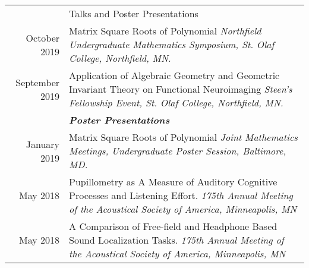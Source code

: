 \documentclass[letterpaper, 11pt]{article}
\newcommand{\headingfont}{\Large\color{Red}}
\newenvironment{SectionTable}[1]{
	\renewcommand*{\arraystretch}{1.7}
	\setlength{\tabcolsep}{10pt}
	\begin{longtable}{Rp{5.2in}} & #1 \\}
	{\end{longtable}\vspace{-.3cm}}
\begin{document}
\begin{SectionTable}{\headingfont Talks and Poster Presentations}
		
		October 2019 &
		Matrix Square Roots of Polynomial \newline
		\textit{Northfield Undergraduate Mathematics Symposium, St. Olaf College, Northfield, MN.} \\


		September 2019 &
		Application of Algebraic Geometry and Geometric Invariant Theory on Functional Neuroimaging \newline
		\textit{Steen’s Fellowship Event, St. Olaf College, Northfield, MN.} \\	


		& \textit{\textbf{Poster Presentations}}\\
		
		January 2019 &
		Matrix Square Roots of Polynomial \newline
		\textit{Joint Mathematics Meetings, Undergraduate Poster Session, Baltimore, MD.} \\
		
		May 2018 &
		Pupillometry as A Measure of Auditory Cognitive Processes and Listening Effort. \newline
		\textit{175th Annual Meeting of the Acoustical Society of America, Minneapolis, MN} \\
		
		May 2018 &
		A Comparison of Free-field and Headphone Based Sound Localization Tasks. \newline
		\textit{175th Annual Meeting of the Acoustical Society of America, Minneapolis, MN} \\
		
	\end{SectionTable}
	
	
\end{document}
